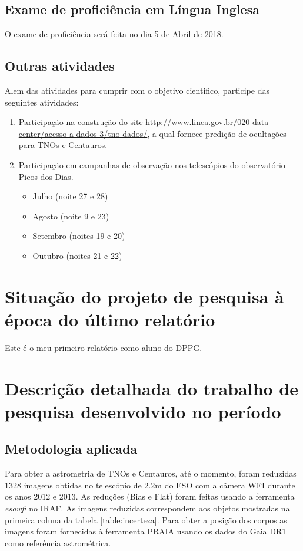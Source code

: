 \documentclass[a4paper, 11pt]{article}
\begin{document}
\subsection{Exame de profici\^encia em L\'ingua Inglesa}

O exame de proficiência será feita no dia 5 de Abril de 2018.

\subsection{Outras atividades}

Alem das atividades para cumprir com o objetivo cientifico, participe das seguintes atividades:

\begin{enumerate}
  \item Participação na construção do site \url{http://www.linea.gov.br/020-data-center/acesso-a-dados-3/tno-dados/}, a qual fornece predição de ocultações para TNOs e Centauros. 
  \item Participação em campanhas de observação nos telescópios do observatório Picos dos Dias. 
  \begin{itemize}
    \item Julho (noite 27 e 28)
    \item Agosto (noite 9 e 23) %
    \item Setembro (noites 19 e 20)
    \item Outubro (noites 21 e 22)
  \end{itemize}
\end{enumerate}
\section{Situação do projeto de pesquisa à época do último relatório}
Este é o meu primeiro relatório como aluno do DPPG.
\section{Descrição detalhada do trabalho de pesquisa desenvolvido no período}

\subsection{Metodologia aplicada}
Para obter a astrometria de TNOs e Centauros, at\'e o momento, foram reduzidas 1328 imagens obtidas no telesc\'opio de 2.2m do ESO com a c\^amera WFI durante os anos 2012 e 2013. As reduções (Bias e Flat) foram feitas usando a ferramenta \textit{esowfi} no IRAF. As imagens reduzidas correspondem aos objetos mostradas na primeira coluna da tabela \ref{table:incerteza}. Para obter a posição dos corpos as imagens foram fornecidas à ferramenta PRAIA usando os dados do Gaia DR1 como refer\^encia astrom\'etrica. 
\end{document}

